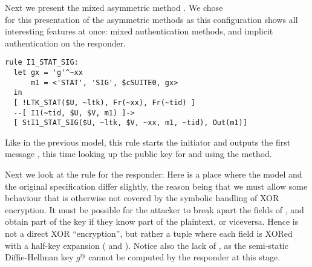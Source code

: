 
\spacehack
\subsubsection{\mStatSig{}}
Next we present the mixed asymmetric method \mStatSig. We chose\\ \mStatSig{} for
this presentation of the asymmetric methods as this configuration shows all
interesting features at once: mixed authentication methods, and implicit
authentication on the responder.

\begin{lstlisting}
rule I1_STAT_SIG:
  let gx = 'g'^~xx
      m1 = <'STAT', 'SIG', $cSUITE0, gx> 
  in
  [ !LTK_STAT($U, ~ltk), Fr(~xx), Fr(~tid) ]
  --[ I1(~tid, $U, $V, m1) ]->
  [ StI1_STAT_SIG($U, ~ltk, $V, ~xx, m1, ~tid), Out(m1)]
\end{lstlisting}
Like in the previous model, this rule starts the initiator and outputs the first
message , this time looking up the public key for  and using the
\mStatSig{} method.

Next we look at the rule for the responder:
Here is a place where the model and the original specification differ
slightly, the reason being that we must allow some behaviour that is
otherwise not covered by the symbolic handling of XOR encryption. It must
be possible for the attacker to break apart the fields of
, and obtain part of the key 
if they know part of the plaintext, or viceversa.
%
Hence  is not a direct XOR ``encryption'', but rather a tuple
where each field is XORed with a half-key expansion ( and
).  Notice also the lack of , as the semi-static
Diffie-Hellman key $g^{iy}$ cannot be computed by the responder at this stage.

